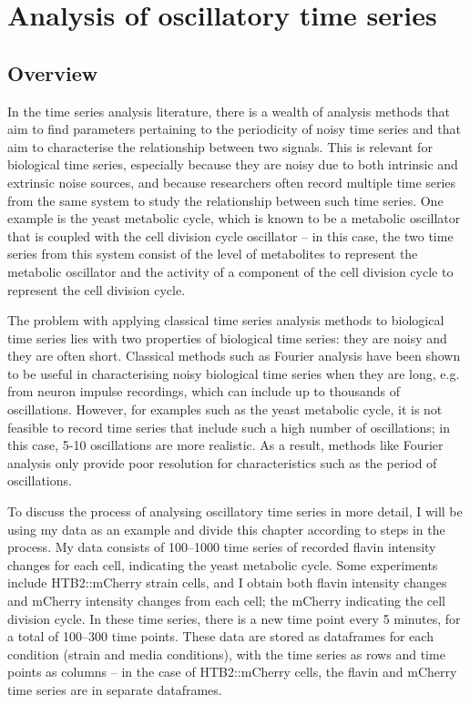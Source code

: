 \chapter{Analysis of oscillatory time series}
\label{ch:analysis}

\section{Overview}
\label{sec:analysis-overview}


In the time series analysis literature, there is a wealth of analysis methods that aim to find parameters pertaining to the periodicity of noisy time series and that aim to characterise the relationship between two signals.
This is relevant for biological time series, especially because they are noisy due to both intrinsic and extrinsic noise sources, and because researchers often record multiple time series from the same system to study the relationship between such time series.
One example is the yeast metabolic cycle, which is known to be a metabolic oscillator that is coupled with the cell division cycle oscillator -- in this case, the two time series from this system consist of the level of metabolites to represent the metabolic oscillator and the activity of a component of the cell division cycle to represent the cell division cycle.

The problem with applying classical time series analysis methods to biological time series lies with two properties of biological time series: they are noisy and they are often short.
Classical methods such as Fourier analysis have been shown to be useful in characterising noisy biological time series when they are long, e.g. from neuron impulse recordings, which can include up to thousands of oscillations.
However, for examples such as the yeast metabolic cycle, it is not feasible to record time series that include such a high number of oscillations; in this case, 5-10 oscillations are more realistic.
As a result, methods like Fourier analysis only provide poor resolution for characteristics such as the period of oscillations.

To discuss the process of analysing oscillatory time series in more detail, I will be using my data as an example and divide this chapter according to steps in the process.
My data consists of 100--1000 time series of recorded flavin intensity changes for each cell, indicating the yeast metabolic cycle.
Some experiments include HTB2::mCherry strain cells, and I obtain both flavin intensity changes and mCherry intensity changes from each cell;
the mCherry indicating the cell division cycle.
In these time series, there is a new time point every 5 minutes, for a total of 100--300 time points.
These data are stored as dataframes for each condition (strain and media conditions), with the time series as rows and time points as columns --
in the case of HTB2::mCherry cells, the flavin and mCherry time series are in separate dataframes.

